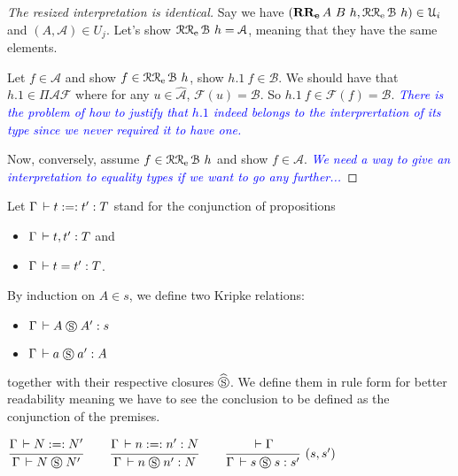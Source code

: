 \documentclass[a4paper,english]{lipics-utf8x}
\newcommand\meta[1]{\noindent\textcolor{blue}{\emph{#1}}}
\begin{document}
  \begin{proof}[The resized interpretation is identical]
    Say we have $(\operatorname{\mathbf{RR_e}}A\ B\ h, \operatorname{\mathcal{R}\mathcal{R}_e} \mathcal{B}\ h) \in \mathcal{U}_i$
    and $(A, \mathcal{A}) \in U_j$.
    Let's show $\operatorname{\mathcal{R}\mathcal{R}_e} \mathcal{B}\ h = \mathcal{A}$, meaning that they
    have the same elements.

    Let $f \in \mathcal{A}$ and show $f \in \operatorname{\mathcal{R}\mathcal{R}_e} \mathcal{B}\ h$, \ie
    show $h.1~f \in \mathcal{B}$.
    We should have that $h.1 \in \Pi \mathcal{A} \mathcal{F}$ where for any
    $u \in \widehat{\mathcal{A}}$, $\mathcal{F}(u) = \mathcal{B}$.
    So $h.1~f \in \mathcal{F}(f) = \mathcal{B}$.
    \meta{There is the problem of how to justify that $h.1$ indeed belongs to
    the interprertation of its type since we never required it to have one.}

    Now, conversely, assume $f \in \operatorname{\mathcal{R}\mathcal{R}_e} \mathcal{B}\ h$ and show
    $f \in \mathcal{A}$.%
    \meta{We need a way to give an interpretation to equality types if we want
    to go any further...}
  \end{proof}


  Let $\Gamma \,\vdash t :=: t' : T$ stand for the conjunction of propositions
  \begin{itemize}
    \item $\Gamma \,\vdash t,t' : T$ and
    \item $\Gamma \,\vdash t = t' : T$.
  \end{itemize}
  By induction on $A \in s$, we define two Kripke relations:
  \begin{itemize}
    \item $\Gamma \,\vdash A \mathrel{\circledS} A' : s$
    \item $\Gamma \,\vdash a \mathrel{\circledS} a' : A$
  \end{itemize}
  together with their respective closures $\mathrel{\widehat{\mathrel{\circledS}}}$.
  We define them in rule form for better readability meaning we have to see the
  conclusion to be defined as the conjunction of the premises.

  \begin{center}
  \(
    \ru{\Gamma \der N :=: N'
      }{\Gamma \der N \Sr N'}
    \qquad
    \ru{\Gamma \der n :=: n' : N
      }{\Gamma \der n \Sr n' : N}
    \qquad
    \rux{\der \Gamma
       }{\Gamma \der s \Sr s : s'
       }{(s,s')}
  \)
  \end{center}
\end{document}
